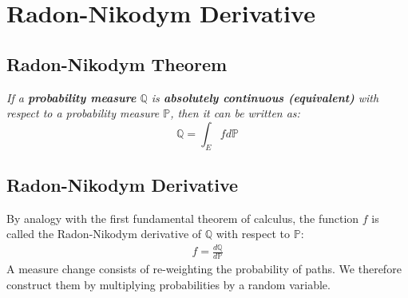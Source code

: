\chapter{Radon-Nikodym Derivative}

\section{Radon-Nikodym Theorem}
\textit{If a \textbf{\color{blue}probability measure} $\mathbb{Q}$ is \textbf{\color{blue}absolutely continuous (equivalent)} with respect to a probability measure $\mathbb{P}$, then it can be written as:}
\begin{equation}
	\mathbb{Q} = \int_{E}{fd\mathbb{P}}
\end{equation}

\section{Radon-Nikodym Derivative}
By analogy with the first fundamental theorem of calculus, the function $f$ is called the Radon-Nikodym derivative of $\mathbb{Q}$ with respect to $\mathbb{P}$:
\begin{eqnarray}
f = \frac{d\mathbb{Q}}{d\mathbb{P}}
\end{eqnarray}
A measure change consists of re-weighting the probability of paths. We therefore construct them by multiplying probabilities by a random variable.